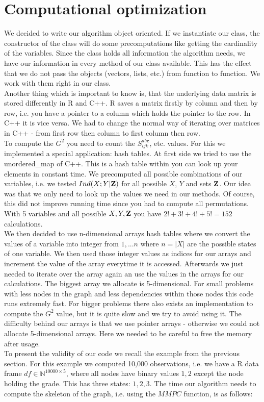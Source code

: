 	\section{Computational optimization}

		We decided to write our algorithm object oriented. If we instantiate our class, the constructor of the class will do some precomputations like getting the cardinality of the variables. Since the class holds all information the algorithm needs, we have our information in every method of our class available. This has the effect that we do not pass the objects (vectors, lists, etc.) from function to function. We work with them right in our class.\\
		Another thing which is important to know is, that the underlying data matrix is stored differently in R and C++. R saves a matrix firstly by column and then by row, i.e. you have a pointer to a column which holds the pointer to the row. In C++ it is vice versa. We had to change the normal way of iterating over matrices in C++ - from first row then column to first column then row.\\
		To compute the $G^{2}$ you need to count the $S^{ab\textbf{c}}_{ijk}$, etc. values. For this we implemented a special application: hash tables. At first side we tried to use the unordered\_map of C++. This is a hash table within you can look up your elements in constant time. We precomputed all possible combinations of our variables, i.e. we tested $Ind(X;Y | {\textbf{Z}})$ for all possible $X$, $Y$ and sets ${\textbf{Z}}$. Our idea was that we only need to look up the values we need in our methods. Of course, this did not improve running time since you had to compute all permutations. With 5 variables and all possible $X, Y, {\textbf{Z}}$ you have $2! + 3! + 4! + 5! = 152$ calculations.\\
		We then decided to use n-dimensional arrays hash tables where we convert the values of a variable into integer from $1,...n$ where $n = |X|$ are the possible states of one variable. We then used those integer values as indices for our arrays and increment the value of the array everytime it is accessed. Afterwards we just needed to iterate over the array again an use the values in the arrays for our calculations. The biggest array we allocate is 5-dimensional. For small problems with less nodes in the graph and less dependencies within those nodes this code runs extremely fast. For bigger problems there also exists an implementation to compute the $G^{2}$ value, but it is quite slow and we try to avoid using it. The difficulty behind our arrays is that we use pointer arrays - otherwise we could not allocate 5-dimensional arrays. Here we needed to be careful to free the memory after usage.\\
		To present the validity of our code we recall the example from the previous section. For this example we computed 10,000 observations, i.e. we have a R data frame $df \in \mathbb{N}^{10000 \times 5}$, where all nodes have binary values $1, 2$ except the node holding the grade. This has three states: $1, 2, 3$. The time our algorithm needs to compute the skeleton of the graph, i.e. using the $MMPC$ function, is as follows:

